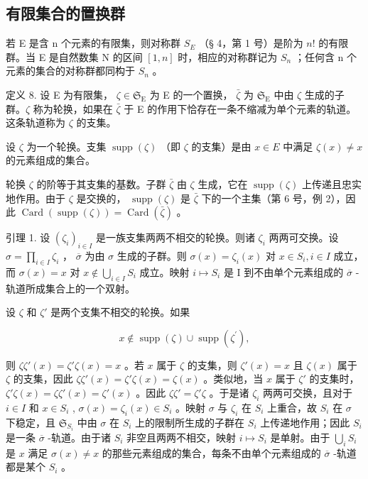 \subsection{有限集合的置换群}

若 E 是含 n 个元素的有限集，则对称群 \(S_{E}\) （§ 4，第 1 号）是阶为 \(n!\) 的有限群。当 E 是自然数集 N 的区间 \([1, n]\) 时，相应的对称群记为 \(S_{n}\) ；任何含 n 个元素的集合的对称群都同构于 \(S_{n}\) 。

定义 8. 设 E 为有限集， \(\zeta \in \mathfrak{S}_{\mathrm{E}}\) 为 E 的一个置换， \(\bar{\zeta}\) 为 \(\mathfrak{S}_{\mathrm{E}}\) 中由 \(\zeta\) 生成的子群。\(\zeta\) 称为轮换，如果在 \(\bar{\zeta}\) 于 E 的作用下恰存在一条不缩减为单个元素的轨道。这条轨道称为 \(\zeta\) 的支集。

设 \(\zeta\) 为一个轮换。支集 \(\operatorname{supp}(\zeta)\) （即 \(\zeta\) 的支集）是由 \(x \in E\) 中满足 \(\zeta(x) \neq x\) 的元素组成的集合。

轮换 \(\zeta\) 的阶等于其支集的基数。子群 \(\bar{\zeta}\) 由 \(\zeta\) 生成，它在 \(\operatorname{supp}(\zeta)\) 上传递且忠实地作用。由于 \(\zeta\) 是交换的， \(\operatorname{supp}(\zeta)\) 是 \(\bar{\zeta}\) 下的一个主集（第 6 号，例 2），因此 \(\operatorname{Card}(\operatorname{supp}(\zeta)) = \operatorname{Card}(\bar{\zeta})\) 。

引理 1. 设 \((\zeta_{i})_{i\in I}\) 是一族支集两两不相交的轮换。则诸 \(\zeta_{i}\) 两两可交换。设 \(\sigma = \prod_{i\in I}\zeta_{i}\) ， \(\overline{\sigma}\) 为由 \(\sigma\) 生成的子群。则 \(\sigma(x) = \zeta_{i}(x)\) 对 \(x\in S_{i}, i\in I\) 成立，而 \(\sigma(x) = x\) 对 \(x\notin \bigcup_{i\in I}S_{i}\) 成立。映射 \(i\mapsto S_i\) 是 I 到不由单个元素组成的 \(\overline{\sigma}\) -轨道所成集合上的一个双射。

设 \(\zeta\) 和 \(\zeta'\) 是两个支集不相交的轮换。如果

\[
x \notin \operatorname{supp} (\zeta) \cup \operatorname{supp} \left(\zeta^ {\prime}\right),
\]

则 \(\zeta\zeta'(x) = \zeta'\zeta(x) = x\) 。若 \(x\) 属于 \(\zeta\) 的支集，则 \(\zeta'(x) = x\) 且 \(\zeta(x)\) 属于 \(\zeta\) 的支集，因此 \(\zeta\zeta'(x) = \zeta'\zeta(x) = \zeta(x)\) 。类似地，当 \(x\) 属于 \(\zeta'\) 的支集时， \(\zeta'\zeta(x) = \zeta\zeta'(x) = \zeta'(x)\) 。因此 \(\zeta\zeta' = \zeta'\zeta\) 。于是诸 \(\zeta_i\) 两两可交换，且对于 \(i \in I\) 和 \(x \in S_i\) , \(\sigma(x) = \zeta_i(x) \in S_i\) 。映射 \(\sigma\) 与 \(\zeta_i\) 在 \(S_i\) 上重合，故 \(S_i\) 在 \(\sigma\) 下稳定，且 \(\mathfrak{S}_{S_i}\) 中由 \(\sigma\) 在 \(S_i\) 上的限制所生成的子群在 \(S_i\) 上传递地作用；因此 \(S_i\) 是一条 \(\overline{\sigma}\) -轨道。由于诸 \(S_i\) 非空且两两不相交，映射 \(i \mapsto S_i\) 是单射。由于 \(\bigcup_{i} S_i\) 是 \(x\) 满足 \(\sigma(x) \neq x\) 的那些元素组成的集合，每条不由单个元素组成的 \(\overline{\sigma}\) -轨道都是某个 \(S_i\) 。

